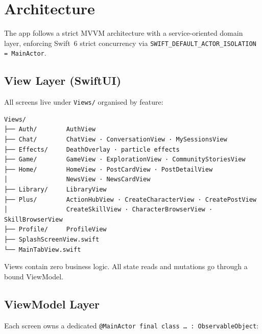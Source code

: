 \documentclass[12pt,a4paper]{article}
\begin{document}
\section{Architecture}

The app follows a strict MVVM architecture with a service-oriented domain layer, enforcing Swift~6 strict concurrency via \texttt{SWIFT\_DEFAULT\_ACTOR\_ISOLATION = MainActor}.

\subsection{View Layer (SwiftUI)}

All screens live under \texttt{Views/} organised by feature:

{\small
\begin{verbatim}
Views/
├── Auth/        AuthView
├── Chat/        ChatView · ConversationView · MySessionsView
├── Effects/     DeathOverlay · particle effects
├── Game/        GameView · ExplorationView · CommunityStoriesView
├── Home/        HomeView · PostCardView · PostDetailView
│                NewsView · NewsCardView
├── Library/     LibraryView
├── Plus/        ActionHubView · CreateCharacterView · CreatePostView
│                CreateSkillView · CharacterBrowserView · SkillBrowserView
├── Profile/     ProfileView
├── SplashScreenView.swift
└── MainTabView.swift
\end{verbatim}
}

Views contain zero business logic. All state reads and mutations go through a bound ViewModel.

\subsection{ViewModel Layer}

Each screen owns a dedicated \texttt{@MainActor final class \ldots{} : ObservableObject}:
\end{document}
